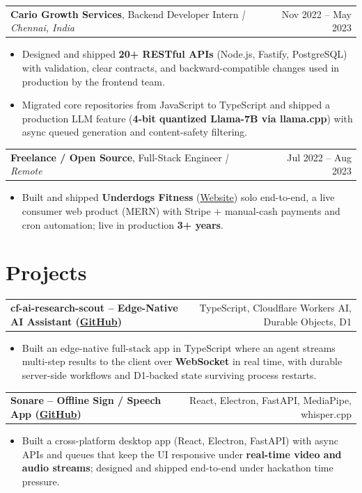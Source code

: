 \documentclass[letterpaper,11pt]{article}
\makeatletter
\newcommand{\expItem}[4]{%
  \vspace{3pt}
  \begin{tabular*}{\textwidth}{@{}l@{\extracolsep{\fill}}r@{}}
    \textbf{#1}, #2 \textit{| #3} & #4 \\
  \end{tabular*}\par\vspace{-2pt}
}
\newcommand{\projItem}[2]{%
  \vspace{6pt}
  \begin{tabular*}{\textwidth}{@{}l@{\extracolsep{\fill}}r@{}}
    \textbf{#1} & #2 \\
  \end{tabular*}\par\vspace{-2pt}
}
\makeatother
\begin{document}
\expItem{Cario Growth Services}{Backend Developer Intern}{Chennai, India}{Nov 2022 -- May 2023}
\begin{itemize}
  \item Designed and shipped \textbf{20+ RESTful APIs} (Node.js, Fastify, PostgreSQL) with validation, clear contracts, and backward-compatible changes used in production by the frontend team.
  \item Migrated core repositories from JavaScript to TypeScript and shipped a production LLM feature (\textbf{4-bit quantized Llama-7B via llama.cpp}) with async queued generation and content-safety filtering.
\end{itemize}

\expItem{Freelance / Open Source}{Full-Stack Engineer}{Remote}{Jul 2022 -- Aug 2023}
\begin{itemize}
  \item Built and shipped \textbf{Underdogs Fitness} (\href{https://www.underdogsfitness.in/}{Website}) solo end-to-end, a live consumer web product (MERN) with Stripe + manual-cash payments and cron automation; live in production \textbf{3+ years}.
\end{itemize}

\section{Projects}

\projItem{cf-ai-research-scout -- Edge-Native AI Assistant {\normalfont\small(\href{https://github.com/Deva-1903/cf_ai_research_scout}{GitHub})}}{TypeScript, Cloudflare Workers AI, Durable Objects, D1}
\begin{itemize}
  \item Built an edge-native full-stack app in TypeScript where an agent streams multi-step results to the client over \textbf{WebSocket} in real time, with durable server-side workflows and D1-backed state surviving process restarts.
\end{itemize}

\projItem{Sonare -- Offline Sign / Speech App {\normalfont\small(\href{https://github.com/Deva-1903/Qualcomm-Sep25-Team-Sonare}{GitHub})}}{React, Electron, FastAPI, MediaPipe, whisper.cpp}
\begin{itemize}
  \item Built a cross-platform desktop app (React, Electron, FastAPI) with async APIs and queues that keep the UI responsive under \textbf{real-time video and audio streams}; designed and shipped end-to-end under hackathon time pressure.
\end{itemize}
\end{document}
